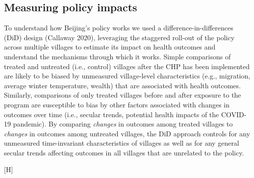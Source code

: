 \documentclass[
  letterpaper,
  DIV=11,
  numbers=noendperiod]{scrartcl}
\makeatletter
\renewenvironment{figure}%
   {\renewcommand\familydefault\sfdefault
    \@float{figure}}
   {\end@float}
\makeatother
\begin{document}
\subsection{Measuring policy impacts}\label{measuring-policy-impacts}

To understand how Beijing's policy works we used a
difference-in-differences (DiD) design (Callaway 2020), leveraging the
staggered roll-out of the policy across multiple villages to estimate
its impact on health outcomes and understand the mechanisms through
which it works. Simple comparisons of treated and untreated (i.e.,
control) villages after the CHP has been implemented are likely to be
biased by unmeasured village-level characteristics (e.g., migration,
average winter temperature, wealth) that are associated with health
outcomes. Similarly, comparisons of only treated villages before and
after exposure to the program are susceptible to bias by other factors
associated with changes in outcomes over time (i.e., secular trends,
potential health impacts of the COVID-19 pandemic). By comparing
\emph{changes} in outcomes among treated villages to \emph{changes} in
outcomes among untreated villages, the DiD approach controls for any
unmeasured time-invariant characteristics of villages as well as for any
general secular trends affecting outcomes in all villages that are
unrelated to the policy.

\begin{figure}[H]


\caption{\label{fig-didfig}Stylized example of
difference-in-differences}

\end{figure}%
\end{document}
